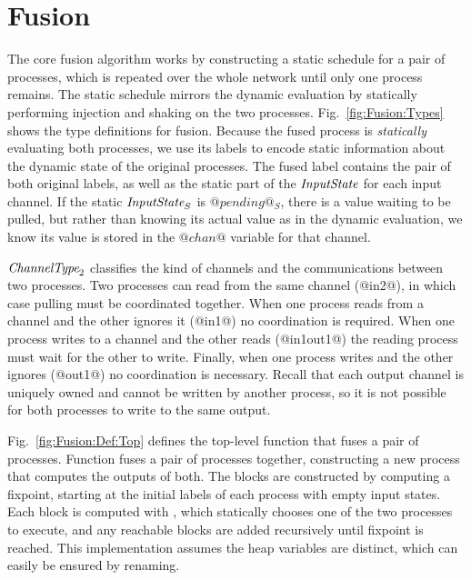 
\clearpage{}
\section{Fusion}
\label{s:Fusion}


The core fusion algorithm works by constructing a static schedule for a pair of processes, which is repeated over the whole network until only one process remains.
The static schedule mirrors the dynamic evaluation by statically performing injection and shaking on the two processes.
Fig.~\ref{fig:Fusion:Types} shows the type definitions for fusion.
Because the fused process is \emph{statically} evaluating both processes, we use its labels to encode static information about the dynamic state of the original processes.
The fused label contains the pair of both original labels, as well as the static part of the $\textit{InputState}$ for each input channel.
If the static $\textit{InputState}_S$ is $@pending@_S$, there is a value waiting to be pulled, but rather than knowing its actual value as in the dynamic evaluation, we know its value is stored in the $@chan@$ variable for that channel.

$\textit{ChannelType}_2$ classifies the kind of channels and the communications between two processes.
Two processes can read from the same channel (@in2@), in which case pulling must be coordinated together.
When one process reads from a channel and the other ignores it (@in1@) no coordination is required.
When one process writes to a channel and the other reads (@in1out1@) the reading process must wait for the other to write.
Finally, when one process writes and the other ignores (@out1@) no coordination is necessary.
Recall that each output channel is uniquely owned and cannot be written by another process, so it is not possible for both processes to write to the same output.





Fig.~\ref{fig:Fusion:Def:Top} defines the top-level function that fuses a pair of processes.
Function  fuses a pair of processes together, constructing a new process that computes the outputs of both.
The blocks are constructed by computing a fixpoint, starting at the initial labels of each process with empty input states.
Each block is computed with , which statically chooses one of the two processes to execute, and any reachable blocks are added recursively until fixpoint is reached.
This implementation assumes the heap variables are distinct, which can easily be ensured by renaming.

